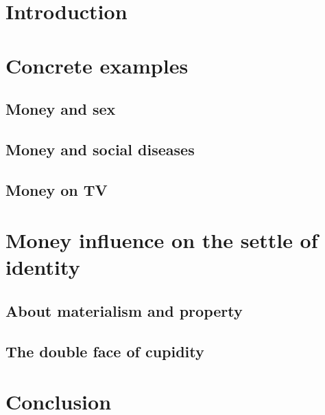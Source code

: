 \section{Introduction}



\section{Concrete examples}

\subsection{Money and sex}



\subsection{Money and social diseases}



\subsection{Money on TV}



\section{Money influence on the settle of identity}

\subsection{About materialism and property}



\subsection{The double face of cupidity}



\section{Conclusion}


